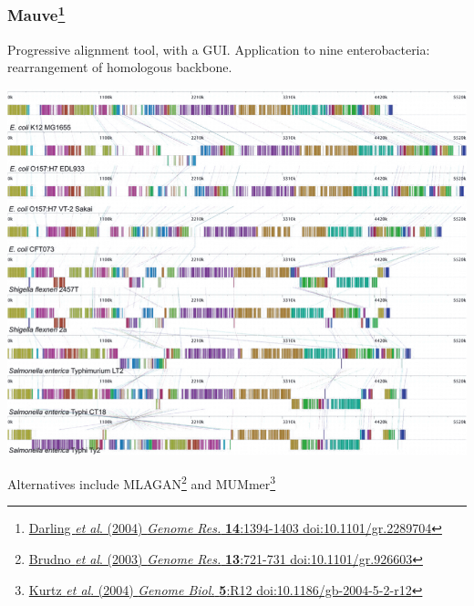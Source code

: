 \begin{frame}
  \frametitle{Mauve\footnote{\tiny{\href{http://dx.doi.org/10.1101/gr.2289704}{Darling \textit{et al}. (2004) \textit{Genome Res.} \textbf{14}:1394-1403 doi:10.1101/gr.2289704}}}}
  Progressive alignment tool, with a GUI. Application to nine enterobacteria: rearrangement of homologous backbone.
  \begin{center}
    \includegraphics[height=0.46\textheight]{images/mauve_entero}
  \end{center}        
  Alternatives include MLAGAN\footnote{\tiny{\href{http://dx.doi.org/10.1101/gr.926603}{Brudno \textit{et al}. (2003) \textit{Genome Res.} \textbf{13}:721-731 doi:10.1101/gr.926603}}} and MUMmer\footnote{\tiny{\href{http://dx.doi.org/10.1186/gb-2004-5-2-r12}{Kurtz \textit{et al}. (2004) \textit{Genome Biol.} \textbf{5}:R12 doi:10.1186/gb-2004-5-2-r12}}}
\end{frame}

